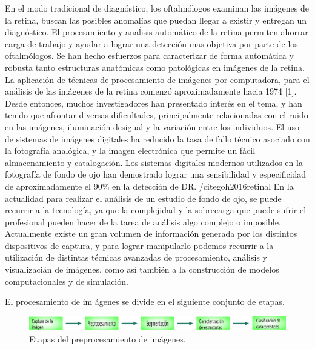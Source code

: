 En el modo tradicional de diagn\'ostico, los oftalm\'ologos examinan las im\'agenes de la retina, buscan las posibles anomal\'ias que puedan llegar a existir y entregan un diagn\'ostico. El procesamiento y ana\'lisis autom\'atico de la retina permiten ahorrar carga de trabajo y ayudar a lograr una detecci\'on mas objetiva por parte de los oftalm\'ologos. Se han hecho esfuerzos para caracterizar de forma autom\'atica y robusta tanto estructuras anatómicas como patológicas en im\'agenes de la retina. La aplicaci\'on de t\'ecnicas de procesamiento de im\'agenes por computadora, para el an\'alisis de las im\'agenes de la retina comenz\'o aproximadamente hacia 1974 [1]. Desde entonces, muchos investigadores han presentado inter\'es en el tema, y han tenido que afrontar diversas dificultades, principalmente relacionadas con el ruido en las im\'agenes, iluminaci\'on desigual y la variaci\'on entre los individuos. \cite{li2004automated}
El uso de sistemas de im\'agenes digitales ha reducido la tasa de fallo t\'ecnico asociado con la fotograf\'ia anal\'ogica, y la imagen electr\'onica que permite un f\'acil almacenamiento y catalogaci\'on. Los sistemas digitales modernos utilizados en la fotograf\'ia de fondo de ojo han demostrado lograr una sensibilidad y especificidad de aproximadamente el 90\% en la detecci\'on de DR. /cite{goh2016retinal}
En la actualidad para realizar el an\'alisis de un  estudio de fondo de ojo, se puede recurrir a la tecnolog\'ia, ya que la complejidad y la sobrecarga que puede sufrir el profesional pueden hacer de la tarea de an\'alisis algo complejo o imposible. Actualmente existe un gran volumen de informaci\'on generada por los distintos dispositivos de captura, y para lograr manipularlo podemos recurrir a la utilizaci\'on de distintas t\'ecnicas avanzadas de procesamiento, an\'alisis y visualizaci\'an de im\'agenes, como as\'i tambi\'en a la construcci\'on de modelos computacionales y de simulaci\'on.

El procesamiento de im \'agenes se divide en el siguiente conjunto de etapas.

\begin{figure}[H]
	{
	\centering
	\includegraphics[width=1\textwidth]{Figures/etapasProcesamiento}
	\caption[Etapas preprocesamiento]{Etapas del preprocesamiento de im\'agenes.}
	\label{fig:EtapasPreprocesamiento}
	}
\end{figure}

